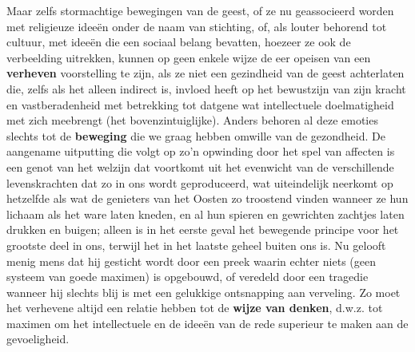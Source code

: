 Maar zelfs stormachtige bewegingen van de geest, of ze nu geassocieerd worden met religieuze ideeën onder de naam van stichting, of, als louter behorend tot cultuur, met ideeën die een sociaal belang bevatten, hoezeer ze ook de verbeelding uitrekken, kunnen op geen enkele wijze de eer opeisen van een \textbf{verheven} voorstelling te zijn, als ze niet een gezindheid van de geest achterlaten die, zelfs als het alleen indirect is, invloed heeft op het bewustzijn van zijn kracht en vastberadenheid met betrekking tot datgene wat intellectuele doelmatigheid met zich meebrengt (het bovenzintuiglijke). Anders behoren al deze emoties slechts tot de \textbf{beweging} die we graag hebben omwille van de gezondheid. De aangename uitputting die volgt op zo'n opwinding door het spel van affecten is een genot van het welzijn dat voortkomt uit het evenwicht van de verschillende levenskrachten dat zo in ons wordt geproduceerd, wat uiteindelijk neerkomt op hetzelfde als wat de genieters van het Oosten zo troostend vinden wanneer ze hun lichaam als het ware laten kneden, en al hun spieren en gewrichten zachtjes laten drukken en buigen; alleen is in het eerste geval het bewegende principe voor het grootste deel in ons, terwijl het in het laatste geheel buiten ons is. Nu gelooft menig mens dat hij gesticht wordt door een preek waarin echter niets (geen systeem van goede maximen) is opgebouwd, of veredeld door een tragedie wanneer hij slechts blij is met een gelukkige ontsnapping aan verveling. Zo moet het verhevene altijd een relatie hebben tot de \textbf{wijze van denken}, d.w.z. tot maximen om het intellectuele en de ideeën van de rede superieur te maken aan de gevoeligheid.

